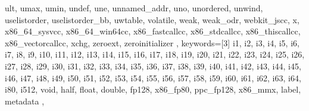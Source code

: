 {{ult, umax, umin, undef, une, unnamed_addr, uno, unordered, unwind, uselistorder,
uselistorder_bb, uwtable, volatile, weak, weak_odr, webkit_jscc, x,
x86_64_sysvcc, x86_64_win64cc, x86_fastcallcc, x86_stdcallcc, x86_thiscallcc,
x86_vectorcallcc, xchg, zeroext, zeroinitializer
	},
	keywords=[3]{
i1, i2, i3, i4, i5, i6, i7, i8, i9, i10, i11, i12, i13, i14, i15, i16, i17, i18,
i19, i20, i21, i22, i23, i24, i25, i26, i27, i28, i29, i30, i31, i32, i33, i34,
i35, i36, i37, i38, i39, i40, i41, i42, i43, i44, i45, i46, i47, i48, i49, i50,
i51, i52, i53, i54, i55, i56, i57, i58, i59, i60, i61, i62, i63, i64, i80, i512,
void, half, float, double, fp128, x86_fp80, ppc_fp128, x86_mmx, label, metadata
	},
}

